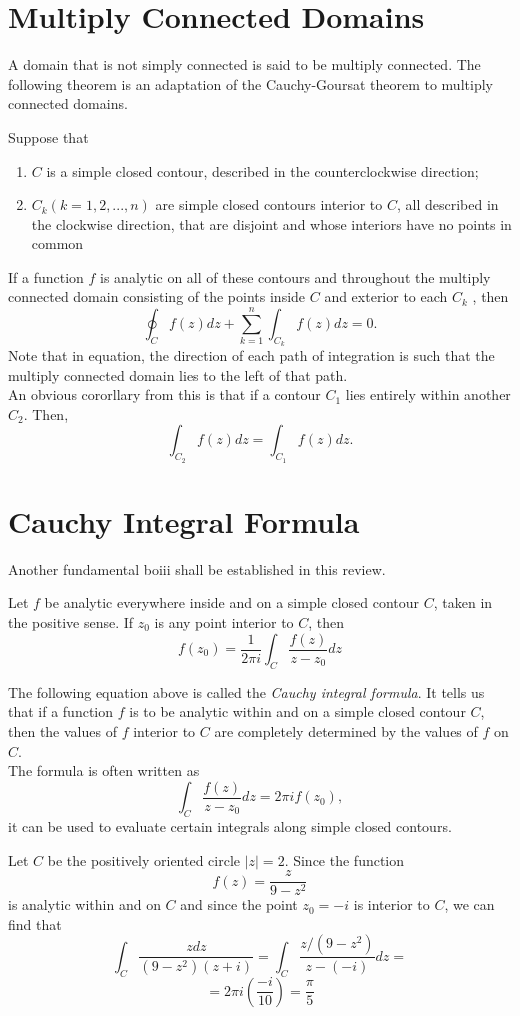 \section{Multiply Connected Domains}
A domain that is not simply connected is said to be multiply connected. The following theorem is an adaptation of the Cauchy-Goursat theorem to multiply connected domains. 
\begin{theorem}
	Suppose that 
	\begin{enumerate}
		\item $ C $ is a simple closed contour, described in the counterclockwise direction;
		\item $ C_k (k = 1,2,...,n)$  are simple closed contours interior to $ C $, all described in the clockwise direction, that are disjoint and whose interiors have no points in
		common
	\end{enumerate}
	If a function $ f $ is analytic on all of these contours and throughout the multiply
	connected domain consisting of the points inside $ C $ and exterior to each $ C_k $ , then
	\[ \oint_C f(z)dz + \sum\limits^{n}_{k =1} \int_{C_k} f(z)dz = 0. \] Note that in equation, the direction of each path of integration is such that
	the multiply connected domain lies to the left of that path. \\ \indent An obvious cororllary from this is that if a contour $ C_1 $ lies entirely within another $ C_2 $. Then, 
	\[ \int_{C_2} f(z) dz = \int_{C_1} f(z) dz. \]
\end{theorem}
\section{Cauchy Integral Formula}
Another fundamental boiii shall be established in this review. 
\begin{theorem}
	Let $ f $ be analytic everywhere inside and on a simple closed contour $ C $, taken in the positive sense. If $ z_0 $ is any point interior to $ C $, then 
	\[ f(z_0) = \dfrac{1}{2 \pi i} \int_{C} \dfrac{f(z)}{z-z_0} dz \]
\end{theorem}
The following equation above is called the \textit{Cauchy integral formula}. It tells us that if a function $ f $ is to be analytic within and on a simple closed contour $ C $, then the values of $ f $ interior to $ C $ are completely determined by the values of $ f $ on $ C $. \\ \indent The formula is often written as \[ \int_{C} \dfrac{f(z)}{z-z_0} dz = 2 \pi i f(z_0),\] it can be used to evaluate certain integrals along simple closed contours.  
\begin{example}
	Let $ C $ be the positively oriented circle $ |z| = 2 $. Since the function 
	\[ f(z) = \dfrac{z}{9 - z^2} \] is analytic within and on $ C $ and since the point $ z_0 = -i $ is interior to $ C $, we can find that 
	\[ \int_{C} \dfrac{z dz}{(9-z^2)(z + i)} = \int_{C} \dfrac{z/ (9-z^2)}{z - (-i)} dz = \]
	\[ = 2 \pi i \left( \dfrac{-i}{10} \right) = \dfrac{\pi}{5} \]
\end{example}
